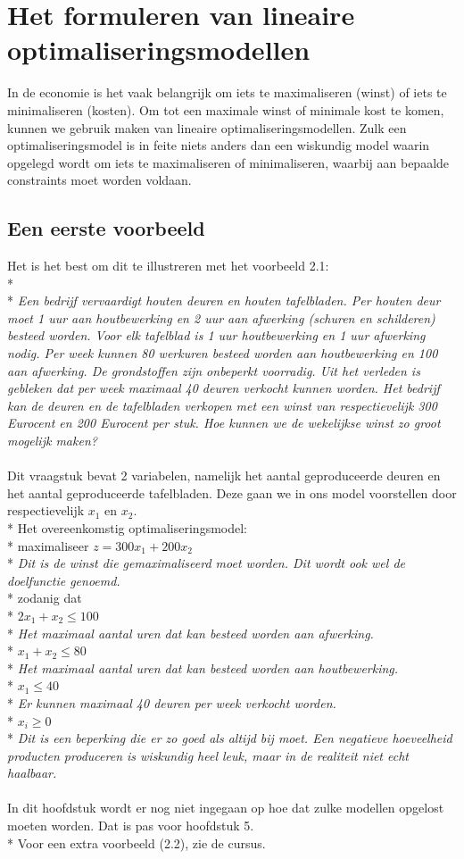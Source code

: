 \documentclass[10pt]{article}
\begin{document}
\section{Het formuleren van lineaire optimaliseringsmodellen}
In de economie is het vaak belangrijk om iets te maximaliseren (winst) of iets te minimaliseren (kosten). Om tot een maximale winst of minimale kost te komen, kunnen we gebruik maken van lineaire optimaliseringsmodellen. Zulk een optimaliseringsmodel is in feite niets anders dan een wiskundig model waarin opgelegd wordt om iets te maximaliseren of minimaliseren, waarbij aan bepaalde constraints moet worden voldaan.
\subsection{Een eerste voorbeeld}
Het is het best om dit te illustreren met het voorbeeld 2.1:\\*\\*
\textit{Een bedrijf vervaardigt houten deuren en houten tafelbladen. Per houten deur moet 1 uur aan houtbewerking en 2 uur aan afwerking (schuren en schilderen) besteed worden. Voor elk tafelblad is 1 uur houtbewerking en 1 uur afwerking nodig. Per week kunnen 80 werkuren besteed worden aan houtbewerking en 100 aan afwerking. De grondstoffen zijn onbeperkt voorradig. Uit het verleden is gebleken dat per week maximaal 40 deuren verkocht kunnen worden. Het bedrijf kan de deuren en de tafelbladen verkopen met een winst van respectievelijk 300 Eurocent en 200 Eurocent per stuk. Hoe kunnen we de wekelijkse winst zo groot mogelijk maken?}\\\\
Dit vraagstuk bevat 2 variabelen, namelijk het aantal geproduceerde deuren en het aantal geproduceerde tafelbladen. Deze gaan we in ons model voorstellen door respectievelijk $x_1$ en $x_2$.\\*
Het overeenkomstig optimaliseringsmodel:\\*
maximaliseer $z = 300x_1 + 200x_2$\\*
\textit{Dit is de winst die gemaximaliseerd moet worden. Dit wordt ook wel de doelfunctie genoemd.}\\*
zodanig dat\\*
$2x_1 + x_2 \le 100$\\*
\textit{Het maximaal aantal uren dat kan besteed worden aan afwerking.}\\*
$x_1 + x_2 \le 80$\\*
\textit{Het maximaal aantal uren dat kan besteed worden aan houtbewerking.}\\*
$x_1 \le 40$\\*
\textit{Er kunnen maximaal 40 deuren per week verkocht worden.}\\*
$x_i \ge 0$\\*
\textit{Dit is een beperking die er zo goed als altijd bij moet. Een negatieve hoeveelheid producten produceren is wiskundig heel leuk, maar in de realiteit niet echt haalbaar.}\\\\
In dit hoofdstuk wordt er nog niet ingegaan op hoe dat zulke modellen opgelost moeten worden. Dat is pas voor hoofdstuk 5.\\*
Voor een extra voorbeeld (2.2), zie de cursus.
\end{document}
